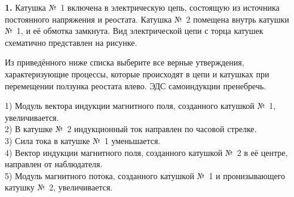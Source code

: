 \documentclass[12pt,a4paper]{article}
\begin{document}
\begin{taskmedium}
\textbf{1.} Катушка №~1 включена в электрическую цепь, состоящую из источника постоянного напряжения
и реостата. Катушка №~2 помещена внутрь катушки №~1, и её обмотка замкнута. Вид электрической цепи с
торца катушек схематично представлен на рисунке.

Из приведённого ниже списка выберите все верные утверждения, характеризующие процессы, которые
происходят в цепи и катушках при перемещении ползунка реостата влево. ЭДС самоиндукции пренебречь.

\nopagebreak\smallskip
\begin{center}
\end{center}

1) Модуль вектора индукции магнитного поля, созданного катушкой №~1, увеличивается.\\
2) В катушке №~2 индукционный ток направлен по часовой стрелке.\\
3) Сила тока в катушке №~1 уменьшается.\\
4) Вектор индукции магнитного поля, созданного катушкой №~2 в её центре, направлен от наблюдателя.\\
5) Модуль магнитного потока, созданного катушкой №~1 и пронизывающего катушку №~2, увеличивается.
\end{taskmedium}
\end{document}
